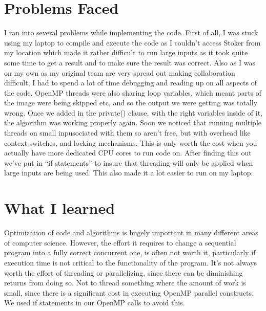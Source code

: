 \documentclass[14pt]{article} %
\begin{document}
\section{Problems Faced}
I ran into several problems while implementing the code. First of all, I was stuck using my laptop to compile and execute the code as I couldn't access Stoker from my location which made it rather difficult to run large inputs as it took quite some time to get a result and to make sure the result was correct. Also as I was on my own as my original team are very spread out making collaboration difficult, I had to spend a lot of time debugging and reading up on all aspects of the code.
OpenMP threads were also sharing loop variables, which meant parts of the image were being skipped etc, and so the output we were getting was totally wrong. Once we added in the private() clause, with the right variables inside of it, the algorithm was working properly again. Soon we noticed that running multiple threads on small inpusociated with them so aren't free, but with overhead like context switches, and locking mechanisms. This is only worth the cost when you actually have more dedicated CPU cores to run code on. After finding this out we’ve put in “if statements” to insure that threading will only be applied when large inputs are being used. This also made it a lot easier to run on my laptop. 
 
\section{What I learned} 
Optimization of code and algorithms is hugely important in many different areas of computer science. However, the effort it requires to change a sequential program into a fully correct concurrent one, is often not worth it, particularly if execution time is not critical to the functionality of the program. 
It’s not always worth the effort of threading or parallelizing, since there can be diminishing returns from doing so.  
Not to thread something where the amount of work is small, since there is a significant cost in executing OpenMP parallel constructs. We used if statements in our OpenMP calls to avoid this.  
\end{document}
